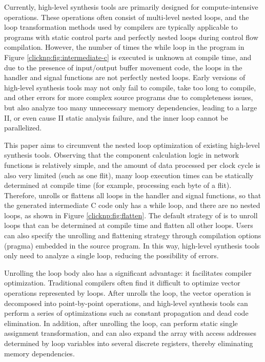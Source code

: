 Currently, high-level synthesis tools are primarily designed for compute-intensive operations. These operations often consist of multi-level nested loops, and the loop transformation methods used by compilers are typically applicable to programs with static control parts and perfectly nested loops during control flow compilation. However, the number of times the while loop in the program in Figure \ref{clicknp:fig:intermediate-c} is executed is unknown at compile time, and due to the presence of input/output buffer movement code, the loops in the handler and signal functions are not perfectly nested loops. Early versions of high-level synthesis tools may not only fail to compile, take too long to compile, and other errors for more complex source programs due to completeness issues, but also analyze too many unnecessary memory dependencies, leading to a large II, or even cause II static analysis failure, and the inner loop cannot be parallelized.

This paper aims to circumvent the nested loop optimization of existing high-level synthesis tools. Observing that the component calculation logic in network functions is relatively simple, and the amount of data processed per clock cycle is also very limited (such as one flit), many loop execution times can be statically determined at compile time (for example, processing each byte of a flit). Therefore, \name unrolls or flattens all loops in the handler and signal functions, so that the generated intermediate C code only has a while loop, and there are no nested loops, as shown in Figure \ref{clicknp:fig:flatten}. The default strategy of \name is to unroll loops that can be determined at compile time and flatten all other loops. Users can also specify the unrolling and flattening strategy through compilation options (pragma) embedded in the source program. In this way, high-level synthesis tools only need to analyze a single loop, reducing the possibility of errors.

Unrolling the loop body also has a significant advantage: it facilitates compiler optimization. Traditional compilers often find it difficult to optimize vector operations represented by loops. After \name unrolls the loop, the vector operation is decomposed into point-by-point operations, and high-level synthesis tools can perform a series of optimizations such as constant propagation and dead code elimination. In addition, after unrolling the loop, \name can perform static single assignment transformation, and can also expand the array with access addresses determined by loop variables into several discrete registers, thereby eliminating memory dependencies.

